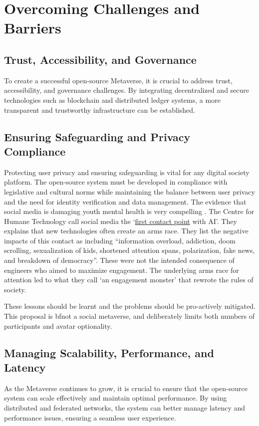 

\section{Overcoming Challenges and Barriers}
\subsection{Trust, Accessibility, and Governance}
To create a successful open-source Metaverse, it is crucial to address trust, accessibility, and governance challenges. By integrating decentralized and secure technologies such as blockchain and distributed ledger systems, a more transparent and trustworthy infrastructure can be established.

\subsection{Ensuring Safeguarding and Privacy Compliance}
Protecting user privacy and ensuring safeguarding is vital for any digital society platform. The open-source system must be developed in compliance with legislative and cultural norms while maintaining the balance between user privacy and the need for identity verification and data management. The evidence that social media is damaging youth mental health is very compelling \cite{haidt2023social}. The Centre for Humane Technology call social media the `\href{https://www.youtube.com/watch?v=xoVJKj8lcNQ}{first contact point} with AI'. They explains that new technologies often create an arms race. They list the negative impacts of this contact as including ``information overload, addiction, doom scrolling, sexualization of kids, shortened attention spans, polarization, fake news, and breakdown of democracy''. These were not the intended consequence of engineers who aimed to maximize engagement.
The underlying arms race for attention led to what they call `an engagement monster' that rewrote the rules of society.\par
These lessons should be learnt and the problems should be pro-actively mitigated. This proposal is bf{not} a social metaverse, and deliberately limits both numbers of participants and avatar optionality.

\subsection{Managing Scalability, Performance, and Latency}
As the Metaverse continues to grow, it is crucial to ensure that the open-source system can scale effectively and maintain optimal performance. By using distributed and federated networks, the system can better manage latency and performance issues, ensuring a seamless user experience.

